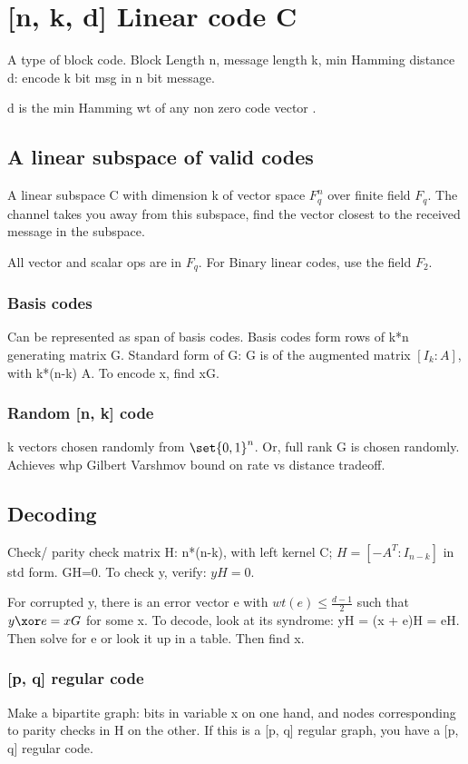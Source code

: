 \documentclass[oneside, article]{memoir}
\begin{document}
\chapter{[n, k, d] Linear code C}
A type of block code. Block Length n, message length k, min Hamming distance d: encode k bit msg in n bit message.

d is the min Hamming wt of any non zero code vector \why.

\section{A linear subspace of valid codes}
A linear subspace C with dimension k of vector space $F_{q}^{n}$ over finite field $F_{q}$. The channel takes you away from this subspace, find the vector closest to the received message in the subspace.

All vector and scalar ops are in $F_{q}$. For Binary linear codes, use the field $F_2$.

\subsection{Basis codes}
Can be represented as span of basis codes. Basis codes form rows of k*n generating matrix G. Standard form of G: G is of the augmented matrix $[I_{k}:A]$, with k*(n-k) A. To encode x, find xG.

\subsection{Random [n, k] code}
k vectors chosen randomly from $\set{0, 1}^{n}$. Or, full rank G is chosen randomly. Achieves whp Gilbert Varshmov bound on rate vs distance tradeoff.

\section{Decoding}
Check/ parity check matrix H: n*(n-k), with left kernel C; $H = [-A^{T}:I_{n-k}]$ in std form. GH=0. To check y, verify: $yH=0$.

For corrupted y, there is an error vector e with $wt(e) \leq \frac{d-1}{2}$ such that $y\xor e = xG$ for some x. To decode, look at its syndrome: yH = (x + e)H = eH. Then solve for e or look it up in a table. Then find x.

\subsection{[p, q] regular code}
Make a bipartite graph: bits in variable x on one hand, and nodes corresponding to parity checks in H on the other. If this is a [p, q] regular graph, you have a [p, q] regular code.
\end{document}
